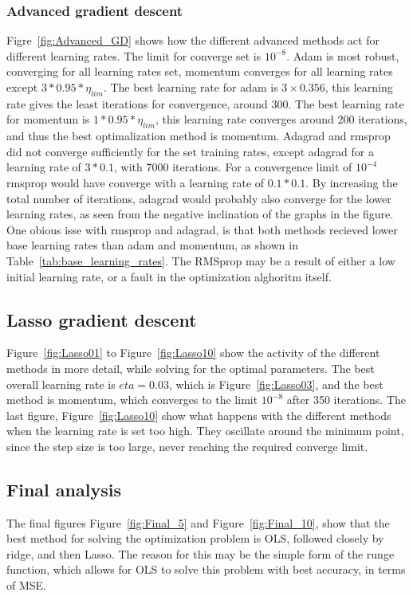 \documentclass[aps,rmp,reprint,raggedbottom,amsmath,amssymb,longbibliography]{revtex4-1}
\begin{document}
\subsubsection{Advanced gradient descent}
Figre~\ref{fig:Advanced_GD} shows how the different advanced methods act for 
different learning rates. The limit for converge set is $10^{-8}$. 
Adam is most robust, converging for all learning rates set, 
momentum converges for all learning rates except $3*0.95*\eta_{lim}$.
The best learning rate for adam is $3\times0.356$, this learning rate
gives the least iterations for convergence, around 300. The best learning
rate for momentum is $1*0.95*\eta_{lim}$, this learning rate converges
around 200 iterations, and thus the best optimalization method is momentum.
Adagrad and rmsprop did not converge sufficiently for the set training rates,
except adagrad for a learning rate of $3*0.1$, with 7000 iterations. 
For a convergence limit of $10^{-4}$ rmsprop would have converge with
a learning rate of $0.1*0.1$. By increasing the total number of iterations,
adagrad would probably also converge for the lower learning rates, as seen
from the negative inclination of the graphs in the figure. 
One obious isse with rmsprop and adagrad, is that both methods recieved 
lower base learning rates than adam and momentum, as shown in 
Table~\ref{tab:base_learning_rates}. \newline 
The RMSprop may be a result of either a low initial learning rate, or a 
fault in the optimization alghoritm itself.

\subsection{Lasso gradient descent}
Figure~\ref{fig:Lasso01} to Figure~\ref{fig:Lasso10} show the 
activity of the different methods in more detail, while solving
for the optimal parameters. The best overall learning rate is
$eta=0.03$, which is Figure~\ref{fig:Lasso03}, and the best method 
is momentum, which converges to the limit $10^{-8}$ after 350 iterations.
The last figure, Figure~\ref{fig:Lasso10} show what happens with 
the different methods when the learning rate is set too high. They oscillate
around the minimum point, since the step size is too large, never reaching
the required converge limit. 

\subsection{Final analysis}
The final figures Figure~\ref{fig:Final_5} and Figure~\ref{fig:Final_10},
show that the best method for solving the optimization problem is OLS,
followed closely by ridge, and then Lasso. The reason for this
may be the simple form of the runge function, which allows for OLS
to solve this problem with best accuracy, in terms of MSE. 
\end{document}
